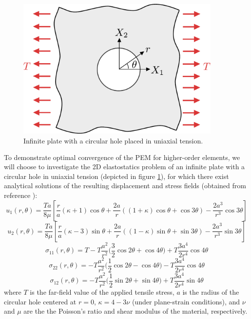 \begin{figure}[!h]
  \centering
  \includegraphics[width=4.0in]{figures/plate_with_hole.pdf}  \caption{Infinite plate with a circular hole placed in uniaxial tension.}
  \label{fig:plate_with_hole_problem}
\end{figure}
To demonstrate optimal convergence of the PEM for higher-order elements, we will choose to investigate the 2D elastostatics problem of an infinite plate with a circular hole in uniaxial tension (depicted in figure \ref{fig:plate_with_hole_problem}), for which there exist analytical solutions of the resulting displacement and stress fields (obtained from reference \cite{Wikiversity:17}):
\begin{equation}
  u_1 (r,\theta) = \frac{Ta}{8\mu} \left[ \frac{r}{a} (\kappa + 1) \cos \theta + \frac{2a}{r} ((1+\kappa) \cos \theta + \cos 3 \theta) - \frac{2a^3}{r^3} \cos 3 \theta \right]
\end{equation}
\begin{equation}
  u_2 (r,\theta) = \frac{Ta}{8\mu} \left[ \frac{r}{a} (\kappa - 3) \sin \theta + \frac{2a}{r} ((1-\kappa) \sin \theta + \sin 3 \theta) - \frac{2a^3}{r^3} \sin 3 \theta \right]
\end{equation}
\begin{equation}
  \sigma_{11} (r, \theta) = T - T \frac{a^2}{r^2} \bigg( \frac{3}{2} \cos 2 \theta + \cos 4 \theta \bigg) + T \frac{3a^4}{2r^4} \cos 4 \theta
\end{equation}
\begin{equation}
  \sigma_{22} (r, \theta) = - T \frac{a^2}{r^2} \bigg( \frac{1}{2} \cos 2 \theta - \cos 4 \theta \bigg) - T \frac{3a^4}{2r^4} \cos 4 \theta
\end{equation}
\begin{equation}
  \sigma_{12} (r, \theta) = - T \frac{a^2}{r^2} \bigg( \frac{1}{2} \sin 2 \theta + \sin 4 \theta \bigg) + T \frac{3a^4}{2r^4} \sin 4 \theta
\end{equation}
where $T$ is the far-field value of the applied tensile stress, $a$ is the radius of the circular hole centered at $r=0$, $\kappa = 4 - 3\nu$ (under plane-strain conditions), and $\nu$ and $\mu$ are the the Poisson's ratio and shear modulus of the material, respectively.

